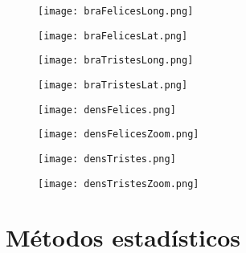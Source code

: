 \documentclass{article}
\begin{document}
\begin{figure}[h!]
\centering
\texttt{[image: braFelicesLong.png]}
\end{figure}

\begin{figure}[h!]
\centering
\texttt{[image: braFelicesLat.png]}
\end{figure}

\newpage

\begin{figure}[h!]
\centering
\texttt{[image: braTristesLong.png]}
\end{figure}

\begin{figure}[h!]
\centering
\texttt{[image: braTristesLat.png]}
\end{figure}

\newpage

\begin{figure}[h!]
\centering
\texttt{[image: densFelices.png]}
\end{figure}


\begin{figure}[h!]
\centering
\texttt{[image: densFelicesZoom.png]}
\end{figure}

\newpage

\begin{figure}[h!]
\centering
\texttt{[image: densTristes.png]}
\end{figure}

\begin{figure}[h!]
\centering
\texttt{[image: densTristesZoom.png]}
\end{figure}

\newpage

\section{Métodos estadísticos}
\end{document}
